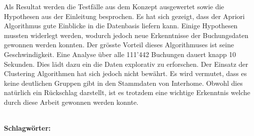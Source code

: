 Als Resultat werden die Testfälle aus dem Konzept ausgewertet sowie die Hypothesen aus der Einleitung besprochen. Es hat sich gezeigt, dass der Apriori Algorithmus gute Einblicke in die Datenbasis liefern kann. Einige Hypothesen mussten widerlegt werden, wodurch jedoch neue Erkenntnisse der Buchungsdaten gewonnen werden konnten. Der grösste Vorteil dieses Algorithmuses ist seine Geschwindigkeit. Eine Analyse über alle 111'442 Buchungen dauert knapp 10 Sekunden. Dies lädt dazu ein die Daten explorativ zu erforschen. Der Einsatz der Clustering Algorithmen hat sich jedoch nicht bewährt. Es wird vermutet, dass es keine deutlichen Gruppen gibt in den Stammdaten von Interhome. Obwohl dies natürlich ein Rückschlag darstellt, ist es trotzdem eine wichtige Erkenntnis welche durch diese Arbeit gewonnen werden konnte. 

%
\mbox{}\\[0.5\baselineskip]\noindent
\textbf{Schlagwörter:} 
